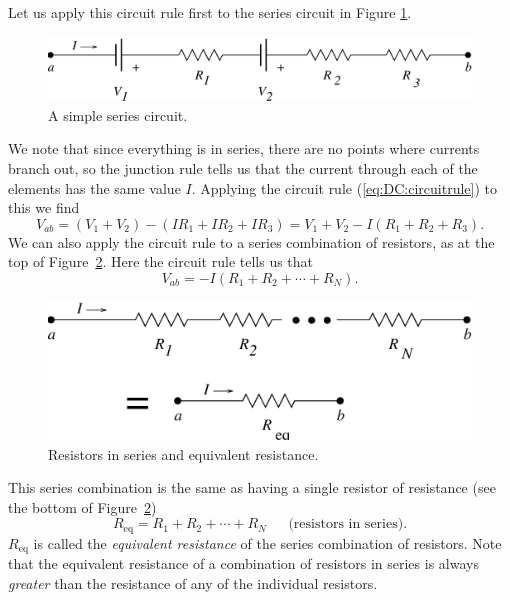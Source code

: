 Let us apply this circuit rule first to the series circuit in Figure 
\ref{fig:DC:series1}.  
\begin{figure}[htb]
\centering \epsfxsize=12cm \includegraphics[scale=0.5]{2_dc/series1.eps}
\caption{A simple series circuit.}
\label{fig:DC:series1}
\end{figure}
We note that since everything is in series, there are no points where currents
branch out, so the junction rule tells us that the current through each of 
the elements has the same value $I$.  Applying the circuit rule 
(\ref{eq:DC:circuitrule}) to this we find
$$
V_{ab} = (V_1+V_2) - ( IR_1 + IR_2 + IR_3) = V_1+V_2 - I (R_1 + R_2 + R_3).
$$
We can also apply the circuit rule to a series combination of resistors, as
at the top of Figure~\ref{fig:DC:resistseries}.
Here the circuit rule tells us that
$$
V_{ab} = -I (R_1+R_2+\cdots+R_N).
$$
\begin{figure}[htb]
\centering \epsfxsize=10cm \includegraphics[scale=0.6]{2_dc/resistseries.eps}
\caption{Resistors in series and equivalent resistance.}
\label{fig:DC:resistseries}
\end{figure}
This series combination is the same as having a single resistor of resistance
(see the bottom of Figure~\ref{fig:DC:resistseries})
$$
R_{\mbox{eq}}=R_1+R_2+\cdots+R_N ~~~~~~~\mbox{(resistors in series)}.
$$
$R_{\mbox{eq}}$ is called the {\it equivalent resistance} of the series 
combination of resistors.  Note that the equivalent resistance of a combination
of resistors in series is always {\it greater} than the resistance of any of 
the individual resistors.

